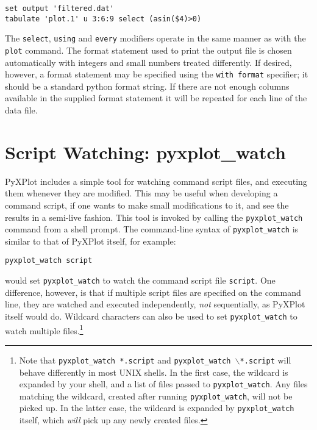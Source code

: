 \documentclass[a4paper,onecolumn,11pt]{book}
\begin{document}
\begin{verbatim}
set output 'filtered.dat'
tabulate 'plot.1' u 3:6:9 select (asin($4)>0)
\end{verbatim}

\noindent The {\tt select}, {\tt using} and {\tt every} modifiers operate in the
same manner as with the {\tt plot} command.  The format statement used to print
the output file is chosen automatically with integers and small numbers treated
differently.  If desired, however, a format statement may be specified using the
{\tt with format} specifier; it should be a standard python format string.  If
there are not enough columns available in the supplied format statement it will
be repeated for each line of the data file.

\section{Script Watching: pyxplot\_watch}

PyXPlot includes a simple tool for watching command script files, and executing
them whenever they are modified. This may be useful when developing a command
script, if one wants to make small modifications to it, and see the results in
a semi-live fashion. This tool is invoked by calling the
\texttt{pyxplot\_watch} command
from a shell prompt. The command-line syntax of \texttt{pyxplot\_watch} is
similar to that of PyXPlot itself, for example:

\begin{verbatim}
pyxplot_watch script
\end{verbatim}

\noindent would set \texttt{pyxplot\_watch} to watch the command script file
\texttt{script}. One difference, however, is that if multiple script files are
specified on the command line, they are watched and executed independently,
\textit{not} sequentially, as PyXPlot itself would do. Wildcard characters can
also be used to set \texttt{pyxplot\_watch} to watch multiple
files.\footnote{Note that \texttt{pyxplot\_watch *.script} and
\texttt{pyxplot\_watch $\backslash$*.script} will behave differently in most
UNIX shells.  In the first case, the wildcard is expanded by your shell, and a
list of files passed to \texttt{pyxplot\_watch}. Any files matching the
wildcard, created after running \texttt{pyxplot\_watch}, will not be picked up.
In the latter case, the wildcard is expanded by \texttt{pyxplot\_watch} itself,
which \textit{will} pick up any newly created files.}
\end{document}

